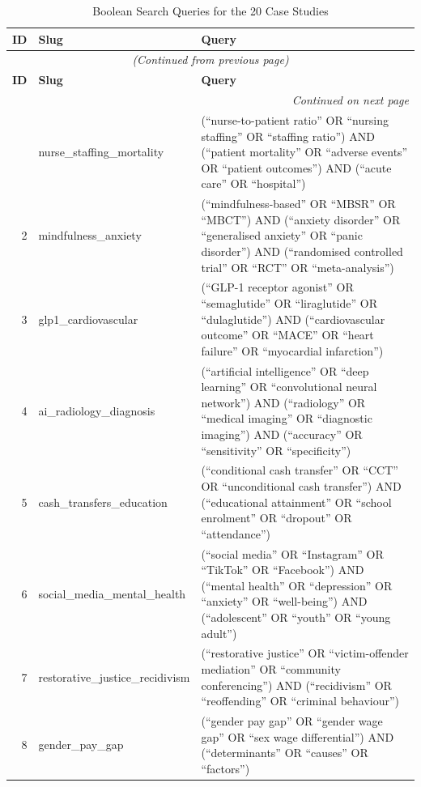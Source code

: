 \documentclass[12pt]{article}
\begin{document}
\begin{longtable}{rp{3.5cm}p{8cm}}
\caption{Boolean Search Queries for the 20 Case Studies}\label{tab:queries}\\
\toprule
\textbf{ID} & \textbf{Slug} & \textbf{Query} \\
\midrule
\endfirsthead
\multicolumn{3}{c}{\textit{(Continued from previous page)}} \\
\toprule
\textbf{ID} & \textbf{Slug} & \textbf{Query} \\
\midrule
\endhead
\midrule
\multicolumn{3}{r}{\textit{Continued on next page}} \\
\endfoot
\bottomrule
\endlastfoot
1 & nurse\_staffing\_mortality & (``nurse-to-patient ratio'' OR ``nursing staffing'' OR ``staffing ratio'') AND (``patient mortality'' OR ``adverse events'' OR ``patient outcomes'') AND (``acute care'' OR ``hospital'') \\
2 & mindfulness\_anxiety & (``mindfulness-based'' OR ``MBSR'' OR ``MBCT'') AND (``anxiety disorder'' OR ``generalised anxiety'' OR ``panic disorder'') AND (``randomised controlled trial'' OR ``RCT'' OR ``meta-analysis'') \\
3 & glp1\_cardiovascular & (``GLP-1 receptor agonist'' OR ``semaglutide'' OR ``liraglutide'' OR ``dulaglutide'') AND (``cardiovascular outcome'' OR ``MACE'' OR ``heart failure'' OR ``myocardial infarction'') \\
4 & ai\_radiology\_diagnosis & (``artificial intelligence'' OR ``deep learning'' OR ``convolutional neural network'') AND (``radiology'' OR ``medical imaging'' OR ``diagnostic imaging'') AND (``accuracy'' OR ``sensitivity'' OR ``specificity'') \\
5 & cash\_transfers\_education & (``conditional cash transfer'' OR ``CCT'' OR ``unconditional cash transfer'') AND (``educational attainment'' OR ``school enrolment'' OR ``dropout'' OR ``attendance'') \\
6 & social\_media\_mental\_health & (``social media'' OR ``Instagram'' OR ``TikTok'' OR ``Facebook'') AND (``mental health'' OR ``depression'' OR ``anxiety'' OR ``well-being'') AND (``adolescent'' OR ``youth'' OR ``young adult'') \\
7 & restorative\_justice\_recidivism & (``restorative justice'' OR ``victim-offender mediation'' OR ``community conferencing'') AND (``recidivism'' OR ``reoffending'' OR ``criminal behaviour'') \\
8 & gender\_pay\_gap & (``gender pay gap'' OR ``gender wage gap'' OR ``sex wage differential'') AND (``determinants'' OR ``causes'' OR ``factors'') \\

\end{longtable}
\end{document}
